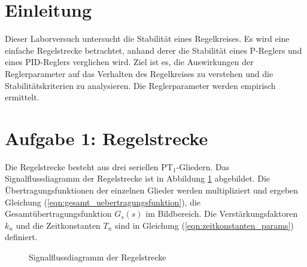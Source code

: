 \section{Einleitung}
Dieser Laborversuch untersucht die Stabilität eines Regelkreises.
Es wird eine einfache Regelstrecke betrachtet, anhand derer die Stabilität eines P-Reglers und eines PID-Reglers verglichen wird.
Ziel ist es, die Auswirkungen der Reglerparameter auf das Verhalten des Regelkreises zu verstehen und die Stabilitätskriterien zu analysieren.
Die Reglerparameter werden empirisch ermittelt.


\section{Aufgabe 1: Regelstrecke}
Die Regelstrecke besteht aus drei seriellen PT$_1$-Gliedern.
Das Signalflussdiagramm der Regelstrecke ist in Abbildung \ref{fig:regelstrecke} abgebildet.
Die Übertragungsfunktionen der einzelnen Glieder werden multipliziert und ergeben Gleichung (\ref{eqn:gesamt_uebertragungsfunktion}), die Gesamtübertragungsfunktion $G_s(s)$ im Bildbereich.
Die Verstärkungsfaktoren $k_n$ und die Zeitkonstanten $T_n$ sind in Gleichung (\ref{eqn:zeitkonstanten_params}) definiert.


\begin{figure}[ht]
    \centering
    \caption{Signalflussdiagramm der Regelstrecke}
    \label{fig:regelstrecke}
\end{figure}

